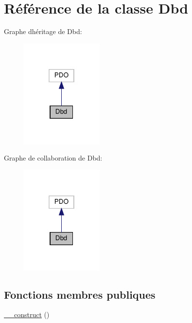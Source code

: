 \hypertarget{class_app_1_1_dbd}{}\section{Référence de la classe Dbd}
\label{class_app_1_1_dbd}


Graphe d\textquotesingle{}héritage de Dbd\+:\nopagebreak
\begin{figure}[H]
\begin{center}
\leavevmode
\includegraphics[width=118pt]{d0/da9/class_app_1_1_dbd__inherit__graph}
\end{center}
\end{figure}


Graphe de collaboration de Dbd\+:\nopagebreak
\begin{figure}[H]
\begin{center}
\leavevmode
\includegraphics[width=118pt]{d7/d09/class_app_1_1_dbd__coll__graph}
\end{center}
\end{figure}
\subsection*{Fonctions membres publiques}
\begin{DoxyCompactItemize}
\item 
\hyperlink{class_app_1_1_dbd_a095c5d389db211932136b53f25f39685}{\+\_\+\+\_\+construct} ()
\end{DoxyCompactItemize}


